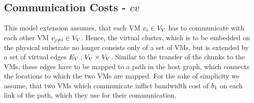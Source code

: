 %
%
%
%
%

\subsection{Communication Costs - $cv$}


This model extension assumes, that each VM  $v_i \in V_V$ 
has to communicate with each other VM $v_{j \neq i} \in 
V_V$. Hence, the virtual cluster, which is to be embedded on the 
physical substrate no longer consists only of a set of VMs, but is extended by a 
set of virtual edges $E_V : V_V \times V_V$. 
Similar to the transfer of the chunks to the VMs, these edges have to be mapped 
to a path in the host graph, which connects the locations to which the two VMs 
are mapped. For the sake of simplicity we assume, that two VMs which communicate 
inflict bandwidth cost of $b_1$ on each link of the path, which they use 
for their communication.

